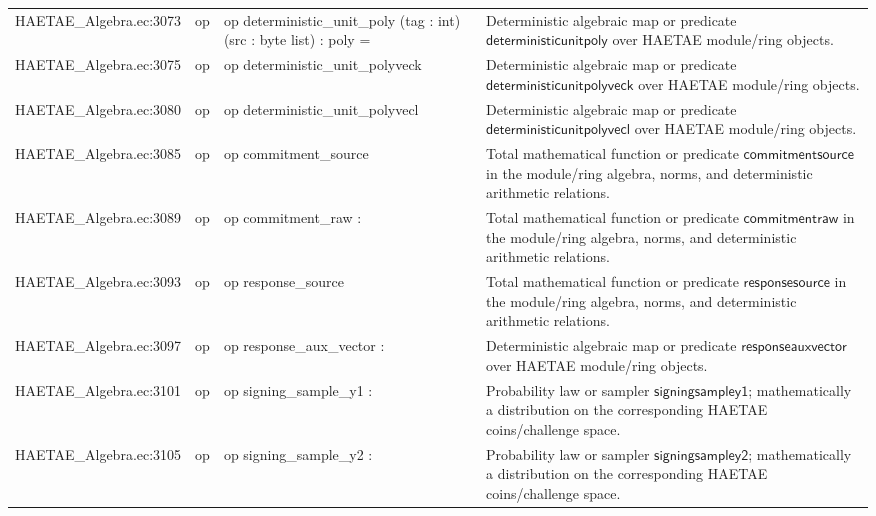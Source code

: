 \documentclass[10pt]{article}
\begin{document}
\begin{longtable}{L{0.11\textwidth}L{0.055\textwidth}L{0.385\textwidth}L{0.41\textwidth}}
HAETAE\_\allowbreak{}Algebra.\allowbreak{}ec:\allowbreak{}3073 & op & {\ttfamily\scriptsize op deterministic\_\allowbreak{}unit\_\allowbreak{}poly (tag : int) (src : byte list) : poly =} & Deterministic algebraic map or predicate $\mathsf{deterministicunitpoly}$ over HAETAE module/ring objects. \\
HAETAE\_\allowbreak{}Algebra.\allowbreak{}ec:\allowbreak{}3075 & op & {\ttfamily\scriptsize op deterministic\_\allowbreak{}unit\_\allowbreak{}polyveck} & Deterministic algebraic map or predicate $\mathsf{deterministicunitpolyveck}$ over HAETAE module/ring objects. \\
HAETAE\_\allowbreak{}Algebra.\allowbreak{}ec:\allowbreak{}3080 & op & {\ttfamily\scriptsize op deterministic\_\allowbreak{}unit\_\allowbreak{}polyvecl} & Deterministic algebraic map or predicate $\mathsf{deterministicunitpolyvecl}$ over HAETAE module/ring objects. \\
HAETAE\_\allowbreak{}Algebra.\allowbreak{}ec:\allowbreak{}3085 & op & {\ttfamily\scriptsize op commitment\_\allowbreak{}source} & Total mathematical function or predicate $\mathsf{commitmentsource}$ in the module/ring algebra, norms, and deterministic arithmetic relations. \\
HAETAE\_\allowbreak{}Algebra.\allowbreak{}ec:\allowbreak{}3089 & op & {\ttfamily\scriptsize op commitment\_\allowbreak{}raw :} & Total mathematical function or predicate $\mathsf{commitmentraw}$ in the module/ring algebra, norms, and deterministic arithmetic relations. \\
HAETAE\_\allowbreak{}Algebra.\allowbreak{}ec:\allowbreak{}3093 & op & {\ttfamily\scriptsize op response\_\allowbreak{}source} & Total mathematical function or predicate $\mathsf{responsesource}$ in the module/ring algebra, norms, and deterministic arithmetic relations. \\
HAETAE\_\allowbreak{}Algebra.\allowbreak{}ec:\allowbreak{}3097 & op & {\ttfamily\scriptsize op response\_\allowbreak{}aux\_\allowbreak{}vector :} & Deterministic algebraic map or predicate $\mathsf{responseauxvector}$ over HAETAE module/ring objects. \\
HAETAE\_\allowbreak{}Algebra.\allowbreak{}ec:\allowbreak{}3101 & op & {\ttfamily\scriptsize op signing\_\allowbreak{}sample\_\allowbreak{}y1 :} & Probability law or sampler $\mathsf{signingsampley1}$; mathematically a distribution on the corresponding HAETAE coins/challenge space. \\
HAETAE\_\allowbreak{}Algebra.\allowbreak{}ec:\allowbreak{}3105 & op & {\ttfamily\scriptsize op signing\_\allowbreak{}sample\_\allowbreak{}y2 :} & Probability law or sampler $\mathsf{signingsampley2}$; mathematically a distribution on the corresponding HAETAE coins/challenge space. \\

\end{longtable}
\end{document}
